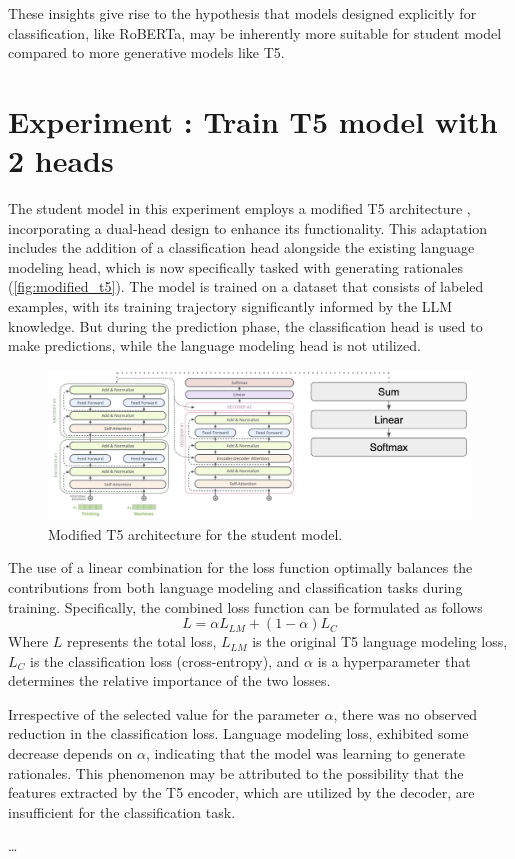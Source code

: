 These insights give rise to the hypothesis that models designed explicitly for classification, like RoBERTa, may be inherently more suitable for student model compared to more generative models like T5.

\newpage

\section{Experiment \theexperiment: Train T5 model with 2 heads}

The student model in this experiment employs a modified T5 architecture \cite{t5}, incorporating a dual-head design to enhance its functionality. This adaptation includes the addition of a classification head alongside the existing language modeling head, which is now specifically tasked with generating rationales (\autoref{fig:modified_t5}). The model is trained on a dataset that consists of labeled examples, with its training trajectory significantly informed by the LLM knowledge. But during the prediction phase, the classification head is used to make predictions, while the language modeling head is not utilized.

\begin{figure}[hbt]
    \centering
    \includegraphics[width=0.99\linewidth]{figs/modified_t5.png}
    \caption{Modified T5 architecture for the student model.}
    \label{fig:modified_t5}
\end{figure}

The use of a linear combination for the loss function optimally balances the contributions from both language modeling and classification tasks during training. Specifically, the combined loss function can be formulated as follows
$$ L = \alpha L_{LM} + (1 - \alpha) L_{C} $$
Where $L$ represents the total loss, $L_{LM}$ is the original T5 language modeling loss, $L_{C}$ is the classification loss (cross-entropy), and $\alpha$ is a hyperparameter that determines the relative importance of the two losses.

Irrespective of the selected value for the parameter $\alpha$, there was no observed reduction in the classification loss. Language modeling loss, exhibited some decrease depends on $\alpha$, indicating that the model was learning to generate rationales. This phenomenon may be attributed to the possibility that the features extracted by the T5 encoder, which are utilized by the decoder, are insufficient for the classification task.

\ldots

